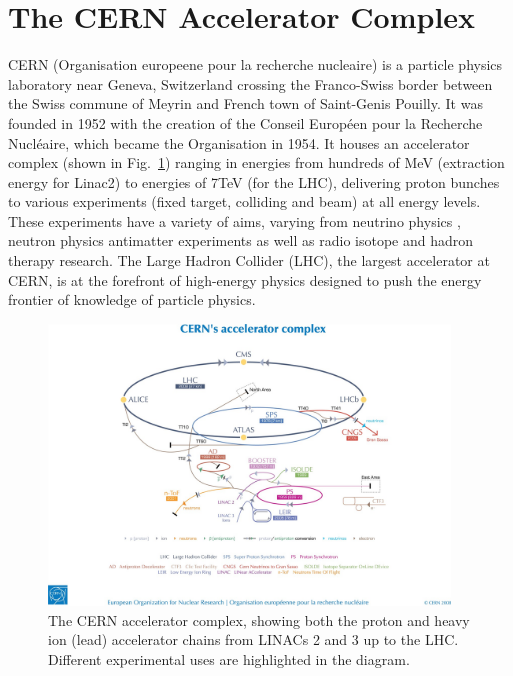 \section{The CERN Accelerator Complex}

CERN (Organisation europeene pour la recherche nucleaire) is a particle physics laboratory near Geneva, Switzerland crossing the Franco-Swiss border between the Swiss commune of Meyrin and French town of Saint-Genis Pouilly. It was founded in 1952 with the creation of the Conseil Europ\'{e}en pour la Recherche Nucl\'{e}aire, which became the Organisation in 1954. It houses an accelerator complex (shown in Fig.~\ref{fig:CERN-acc-complex}) ranging in energies from hundreds of MeV (extraction energy for Linac2) to energies of 7TeV (for the LHC), delivering proton bunches to various experiments (fixed target, colliding and beam) at all energy levels. These experiments have a variety of aims, varying from neutrino physics \cite{Bailey:CNGS}, neutron physics \cite{ntof} antimatter experiments \cite{Gabrielse:ATRAP,Hori:ASACUSA,Hangst:ALPHA} as well as radio isotope \cite{Kadi:ISOLDE} and hadron therapy \cite{Maggiore:ACE} research. The Large Hadron Collider (LHC), the largest accelerator at CERN, is at the forefront of high-energy physics designed to push the energy frontier of knowledge of particle physics.

\begin{figure}
\begin{center}
\includegraphics[width=0.95\textwidth]{Introduction/figures/cernaccelerators.jpg}
\end{center}
\label{fig:CERN-acc-complex}
\caption{The CERN accelerator complex, showing both the proton and heavy ion (lead) accelerator chains from LINACs 2 and 3 up to the LHC. Different experimental uses are highlighted in the diagram.}
\end{figure}

